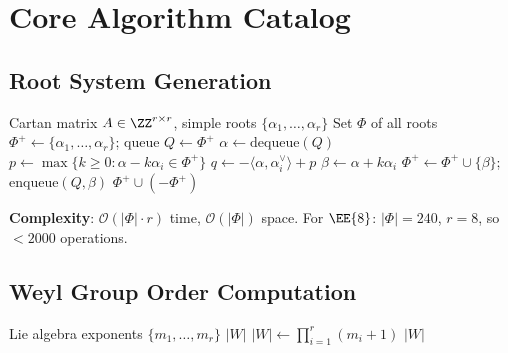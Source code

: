 \section{Core Algorithm Catalog}
\label{app:algorithms}

\subsection{Root System Generation}

\begin{algorithm}[H]
\caption{Generate Root System via Positive Root Enumeration}
\label{alg:roots}
\begin{algorithmic}[1]
\Require Cartan matrix $A \in \ZZ^{r \times r}$, simple roots
    $\{\alpha_1, \ldots, \alpha_r\}$
\Ensure Set $\Phi$ of all roots
\State $\Phi^+ \gets \{\alpha_1, \ldots, \alpha_r\}$; queue $Q
    \gets \Phi^+$
    \State $\alpha \gets \text{dequeue}(Q)$
        \State $p \gets \max\{k \ge 0 : \alpha - k\alpha_i \in \Phi^+\}$
        \State $q \gets -\langle\alpha, \alpha_i^\vee\rangle + p$
            \State $\beta \gets \alpha + k\alpha_i$
            \If{$\beta \notin \Phi^+$}
                \State $\Phi^+ \gets \Phi^+ \cup \{\beta\}$;
                    enqueue$(Q, \beta)$
            \EndIf
        \EndFor
    \EndFor
\EndWhile
\State \Return $\Phi^+ \cup (-\Phi^+)$
\end{algorithmic}
\end{algorithm}

\textbf{Complexity}: $\mathcal{O}(|\Phi| \cdot r)$ time,
$\mathcal{O}(|\Phi|)$ space.  For $\EE{8}$: $|\Phi| = 240$, $r = 8$,
so $< 2000$ operations.

\subsection{Weyl Group Order Computation}

\begin{algorithm}[H]
\caption{Weyl Group Order via Exponent Formula}
\label{alg:weyl}
\begin{algorithmic}[1]
\Require Lie algebra exponents $\{m_1, \ldots, m_r\}$
\Ensure $|W|$
\State $|W| \gets \prod_{i=1}^{r} (m_i + 1)$
\State \Return $|W|$
\end{algorithmic}
\end{algorithm}

